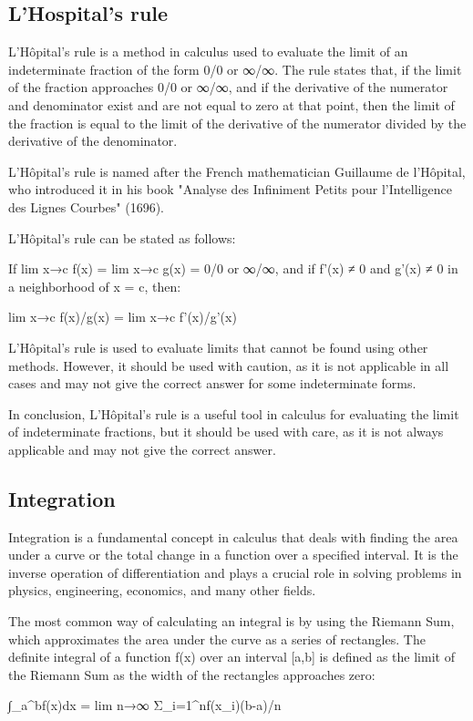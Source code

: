 \documentclass[12pt, a4paper, oneside]{article}
\begin{document}
\subsection{ L’Hospital’s rule }
L'Hôpital's rule is a method in calculus used to evaluate the limit of an indeterminate fraction of the form 0/0 or ∞/∞. The rule states that, if the limit of the fraction approaches 0/0 or ∞/∞, and if the derivative of the numerator and denominator exist and are not equal to zero at that point, then the limit of the fraction is equal to the limit of the derivative of the numerator divided by the derivative of the denominator.

L'Hôpital's rule is named after the French mathematician Guillaume de l'Hôpital, who introduced it in his book "Analyse des Infiniment Petits pour l'Intelligence des Lignes Courbes" (1696).

L'Hôpital's rule can be stated as follows:

If lim x→c f(x) = lim x→c g(x) = 0/0 or ∞/∞, and if f'(x) ≠ 0 and g'(x) ≠ 0 in a neighborhood of x = c, then:

lim x→c f(x)/g(x) = lim x→c f'(x)/g'(x)

L'Hôpital's rule is used to evaluate limits that cannot be found using other methods. However, it should be used with caution, as it is not applicable in all cases and may not give the correct answer for some indeterminate forms.

In conclusion, L'Hôpital's rule is a useful tool in calculus for evaluating the limit of indeterminate fractions, but it should be used with care, as it is not always applicable and may not give the correct answer.
\subsection{ Integration }
Integration is a fundamental concept in calculus that deals with finding the area under a curve or the total change in a function over a specified interval. It is the inverse operation of differentiation and plays a crucial role in solving problems in physics, engineering, economics, and many other fields.

The most common way of calculating an integral is by using the Riemann Sum, which approximates the area under the curve as a series of rectangles. The definite integral of a function f(x) over an interval [a,b] is defined as the limit of the Riemann Sum as the width of the rectangles approaches zero:

∫_a^bf(x)dx = lim n→∞ Σ_i=1^nf(x_i)(b-a)/n
\end{document}
